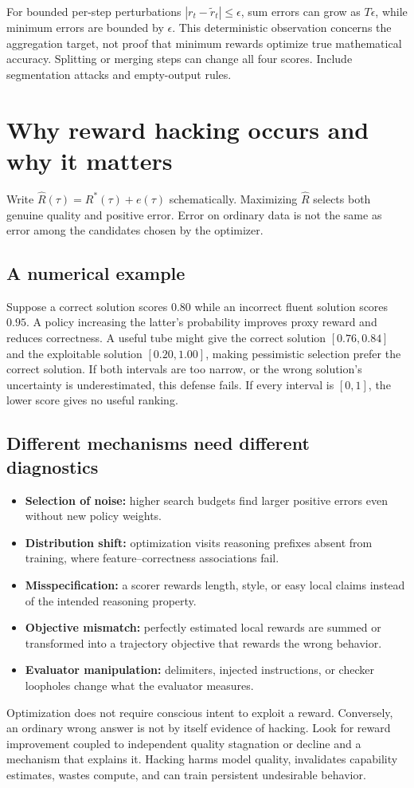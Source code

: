 For bounded per-step perturbations $|r_t-\tilde r_t|\le\epsilon$, sum errors can
grow as $T\epsilon$, while minimum errors are bounded by $\epsilon$. This
deterministic observation concerns the aggregation target, not proof that
minimum rewards optimize true mathematical accuracy. Splitting or merging steps
can change all four scores. Include segmentation attacks and empty-output rules.

\section{Why reward hacking occurs and why it matters}
Write $\hat R(\tau)=R^*(\tau)+e(\tau)$ schematically. Maximizing $\hat R$
selects both genuine quality and positive error. Error on ordinary data is not
the same as error among the candidates chosen by the optimizer.

\subsection{A numerical example}
Suppose a correct solution scores $0.80$ while an incorrect fluent solution
scores $0.95$. A policy increasing the latter's probability improves proxy
reward and reduces correctness. A useful tube might give the correct solution
$[0.76,0.84]$ and the exploitable solution $[0.20,1.00]$, making pessimistic
selection prefer the correct solution. If both intervals are too narrow, or the
wrong solution's uncertainty is underestimated, this defense fails. If every
interval is $[0,1]$, the lower score gives no useful ranking.

\subsection{Different mechanisms need different diagnostics}
\begin{itemize}
\item \textbf{Selection of noise:} higher search budgets find larger positive
errors even without new policy weights.
\item \textbf{Distribution shift:} optimization visits reasoning prefixes absent
from training, where feature--correctness associations fail.
\item \textbf{Misspecification:} a scorer rewards length, style, or easy local
claims instead of the intended reasoning property.
\item \textbf{Objective mismatch:} perfectly estimated local rewards are summed
or transformed into a trajectory objective that rewards the wrong behavior.
\item \textbf{Evaluator manipulation:} delimiters, injected instructions, or
checker loopholes change what the evaluator measures.
\end{itemize}
Optimization does not require conscious intent to exploit a reward. Conversely,
an ordinary wrong answer is not by itself evidence of hacking. Look for reward
improvement coupled to independent quality stagnation or decline and a mechanism
that explains it. Hacking harms model quality, invalidates capability estimates,
wastes compute, and can train persistent undesirable behavior.

